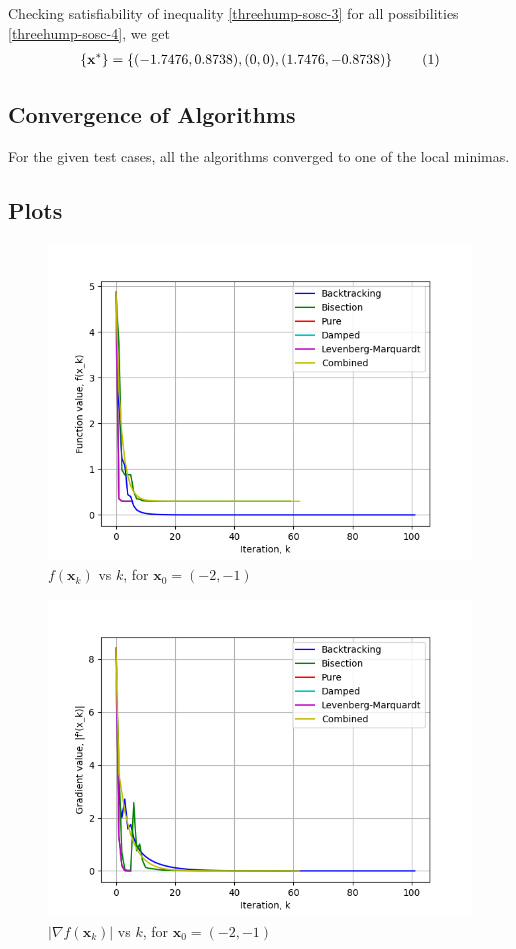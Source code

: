 \documentclass[a4paper]{article}
\newcommand\numberthis{\addtocounter{equation}{1}\tag{\theequation}}
\begin{document}
Checking satisfiability of inequality \eqref{threehump-sosc-3} for all possibilities \eqref{threehump-sosc-4}, we get
\begin{align*}
\left\{\textbf{x}^*\right\} = \left\{(-1.7476, 0.8738), (0, 0), (1.7476, -0.8738)\right\} \numberthis \label{threehump-minima}
\end{align*}

\subsection{Convergence of Algorithms}

For the given test cases, all the algorithms converged to one of the local minimas.

\subsection{Plots}

\begin{figure}[H]
      \centering
      \includegraphics[width=.75\textwidth]{three_hump_camel_function_vals.png}
      \caption{$f(\textbf{x}_k)$ vs $k$, for $\textbf{x}_0 = (-2, -1)$}
\end{figure}

\begin{figure}[H]
    \centering
    \includegraphics[width=.75\textwidth]{three_hump_camel_function_grad.png}
    \caption{$|\nabla f(\textbf{x}_k)|$ vs $k$, for $\textbf{x}_0 = (-2, -1)$}
\end{figure}
\end{document}

